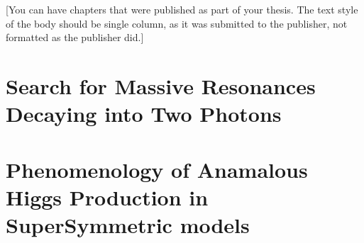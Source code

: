 \documentclass[14pt]{caltech_thesis}
\begin{document}
[You can have chapters that were published as part of your thesis. The
text style of the body should be single column, as it was submitted to
the publisher, not formatted as the publisher did.]

\printbibliography[heading=bibintoc]

 
\appendix

\chapter{Search for Massive Resonances Decaying into Two Photons}

\chapter{Phenomenology of Anamalous Higgs Production in SuperSymmetric models}






\printindex

\theendnotes

\end{document}
